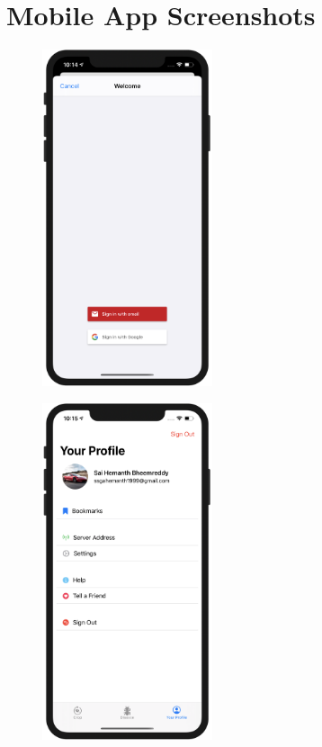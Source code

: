 \documentclass[../Report.tex]{subfiles}
\begin{document}

\section{Mobile App Screenshots}
\begin{figure}[H]
    \centering
    \begin{minipage}{.5\textwidth}
      \centering
      \includegraphics[width=5cm]{images/user_login.png}
      \label{fig:ss_user_login}
    \end{minipage}%
    \begin{minipage}{.5\textwidth}
      \centering
      \includegraphics[width=5cm]{images/profile.png}
      \label{fig:ss_user_profile}
    \end{minipage}
\end{figure}
\end{document}
